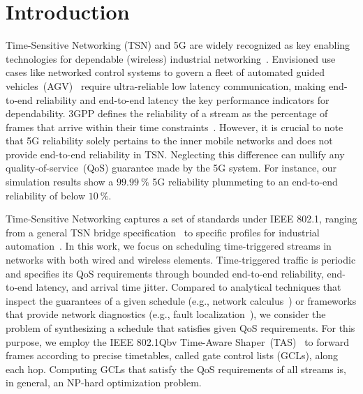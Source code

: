 \section{Introduction}
Time-Sensitive Networking (TSN) and 5G are widely recognized as key enabling technologies for dependable (wireless) industrial networking~\cite{9299391}.
Envisioned use cases \ldash like networked control systems to govern a fleet of automated guided vehicles~(AGV)~\cite{3gpp.22.104, det6g_usecases} \rdash require ultra-reliable low latency communication, making end-to-end reliability and end-to-end latency the key performance indicators for dependability.
3GPP defines the reliability of a stream as the percentage of frames that arrive within their time constraints~\cite{3gpp.22.261}. 
However, it is crucial to note that 5G reliability solely pertains to the inner mobile networks and does not provide end-to-end reliability in TSN.
Neglecting this difference can nullify any quality-of-service~(QoS) guarantee made by the 5G system.
For instance, our simulation results show a $\qty{99.99}{\percent}$ 5G reliability plummeting to an end-to-end reliability of below $\qty{10}{\percent}$.

Time-Sensitive Networking captures a set of standards under IEEE 802.1, ranging from a general TSN bridge specification~\cite{802.1Q} to specific profiles for industrial automation~\cite{60802}.
In this work, we focus on scheduling time-triggered streams in networks with both wired and wireless elements.
Time-triggered traffic is periodic and specifies its QoS requirements through bounded end-to-end reliability, end-to-end latency, and arrival time jitter.
Compared to analytical techniques that inspect the guarantees of a given schedule (e.g., network calculus~\cite{le2001network}) or frameworks that provide network diagnostics (e.g., fault localization~\cite{10682902}), we consider the problem of synthesizing a schedule that satisfies given QoS requirements.
For this purpose, we employ the IEEE 802.1Qbv Time-Aware Shaper~(TAS)~\cite{802.1Qbv} to forward frames according to precise timetables, called gate control lists (GCLs), along each hop.
Computing GCLs that satisfy the QoS requirements of all streams is, in general, an NP-hard optimization problem.

